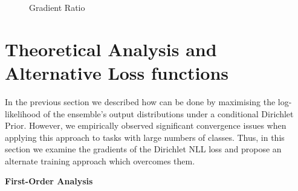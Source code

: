 \begin{figure}[ht]
    \centering
    \caption{Gradient Ratio}
    \label{fig:grad_ratio}
\end{figure}



\section{Theoretical Analysis and Alternative Loss functions}

In the previous section we described how \Endd can be done by maximising the log-likelihood of the ensemble's output distributions under a conditional Dirichlet Prior. However, we empirically observed significant convergence issues when applying this approach to tasks with large numbers of classes. Thus, in this section we examine the gradients of the Dirichlet NLL loss and propose an alternate training approach which overcomes them.


\textbf{First-Order Analysis}


